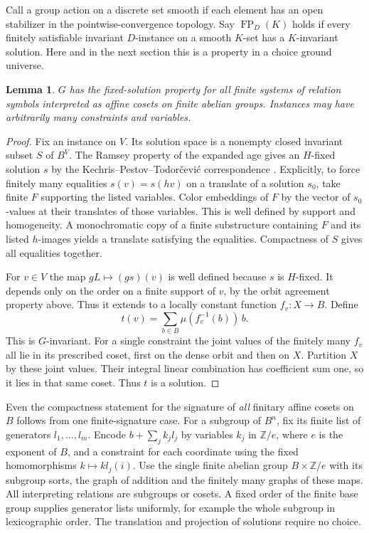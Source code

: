 \documentclass[11pt]{article}
\newtheorem{lemma}[theorem]{Lemma}
\newcommand{\FP}{\operatorname{FP}}
\begin{document}
Call a group action on a discrete set smooth if each element has an open stabilizer in the pointwise-convergence topology. Say $\FP_D(K)$ holds if every finitely satisfiable invariant $D$-instance on a smooth $K$-set has a $K$-invariant solution. Here and in the next section this is a property in a choice ground universe.
\begin{lemma}\label{affine}
$G$ has the fixed-solution property for all finite systems of relation symbols interpreted as affine cosets on finite abelian groups. Instances may have arbitrarily many constraints and variables.
\end{lemma}
\begin{proof}
Fix an instance on $V$. Its solution space is a nonempty closed invariant subset $S$ of $B^V$. The Ramsey property of the expanded age gives an $H$-fixed solution $s$ by the Kechris--Pestov--Todor\v cevi\'c correspondence \cite{kpt,bod}. Explicitly, to force finitely many equalities $s(v)=s(hv)$ on a translate of a solution $s_0$, take finite $F$ supporting the listed variables. Color embeddings of $F$ by the vector of $s_0$-values at their translates of those variables. This is well defined by support and homogeneity. A monochromatic copy of a finite substructure containing $F$ and its listed $h$-images yields a translate satisfying the equalities. Compactness of $S$ gives all equalities together.

For $v\in V$ the map $gL\mapsto (g s)(v)$ is well defined because $s$ is $H$-fixed. It depends only on the order on a finite support of $v$, by the orbit agreement property above. Thus it extends to a locally constant function $f_v:X\to B$. Define
\[
    t(v)=\sum_{b\in B}\mu(f_v^{-1}(b))\,b.
\]
This is $G$-invariant. For a single constraint the joint values of the finitely many $f_v$ all lie in its prescribed coset, first on the dense orbit and then on $X$. Partition $X$ by these joint values. Their integral linear combination has coefficient sum one, so it lies in that same coset. Thus $t$ is a solution.
\end{proof}

Even the compactness statement for the signature of \emph{all} finitary affine cosets on $B$ follows from one finite-signature case. For a subgroup of $B^n$, fix its finite list of generators $l_1,\ldots,l_m$. Encode $b+\sum_j k_j l_j$ by variables $k_j$ in $\mathbb Z/e$, where $e$ is the exponent of $B$, and a constraint for each coordinate using the fixed homomorphisms $k\mapsto k l_j(i)$. Use the single finite abelian group $B\times\mathbb Z/e$ with its subgroup sorts, the graph of addition and the finitely many graphs of these maps. All interpreting relations are subgroups or cosets. A fixed order of the finite base group supplies generator lists uniformly, for example the whole subgroup in lexicographic order. The translation and projection of solutions require no choice.
\end{document}
